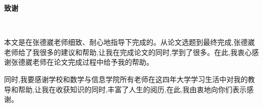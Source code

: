 
\begin{center}
	\bf\xiaosanhao 致谢
\end{center}
~

{\rm\wuhao 
	
本文是在张德崴老师细致、耐心地指导下完成的。从论文选题到最终完成,张德崴老师给了我很多的建议和帮助,让我在完成论文的同时,学到了很多。在此,我衷心感谢张德崴老师在论文完成过程中给予我的帮助。

同时,我要感谢学校和数学与信息学院所有老师在这四年大学学习生活中对我的教导和帮助,让我在收获知识的同时,丰富了人生的阅历,在此,我由衷地向你们表示感谢。\\
~\\
~




}